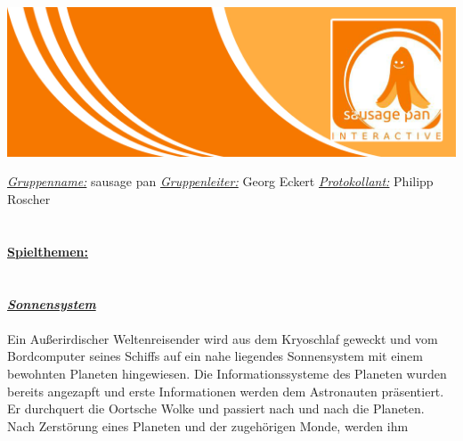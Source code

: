 \documentclass[10pt,a4paper,notitlepage]{report}
\author{Sausage Pan}
\begin{document}
	\newcommand{\Eins}[1]{\color{orange}\underline{\textbf{{\Large#1}}}} %
	\newcommand{\Zwei}[1]{\color{orange}\textit{\underline{\textbf{{\large#1}}}}} %
	\newcommand{\Drei}[1]{\color{orange}\textit{\textbf{{\normalsize#1}}}} %
	\newcommand{\Text}{\color{schwarz}} %
	\newcommand{\Fusszeile}
	{\textit{{\footnotesize Eckert, Georg - Roscher, Philipp - Krien, Alexandra - Sinakov, Sergej - Blasberg, Bettina - Groß, Stephanie Sara}}} %
	\marginpar{\vspace{3.85mm} \color{hellorange}\rule{0.8mm}{53.3mm} \\[3mm] \color{orange}\rule{0.8mm}{170mm}}
	\begin{center}
		\includegraphics[width=160mm]{header2}
	\end{center}
	\color{orange} \underline{\textit{Gruppenname:}} \color{schwarz}sausage pan \color{orange} \underline{\textit{Gruppenleiter:}} \color{schwarz}Georg Eckert   \color{orange} \underline{\textit{Protokollant:}} \color{schwarz}Philipp Roscher\\
	\\
	\\
	\Eins{Spielthemen:}\\
	\\
	\\
	\Zwei{Sonnensystem}\\
	\\
	\Text
		Ein Außerirdischer Weltenreisender wird aus dem Kryoschlaf geweckt und vom
	Bordcomputer seines Schiffs auf ein nahe liegendes Sonnensystem mit einem
	bewohnten Planeten hingewiesen. Die Informationssysteme des Planeten wurden
	bereits angezapft und erste Informationen werden dem Astronauten präsentiert.
	Er durchquert die Oortsche Wolke und passiert nach und nach die Planeten.
	Nach Zerstörung eines Planeten und der zugehörigen Monde, werden ihm
\end{document}
